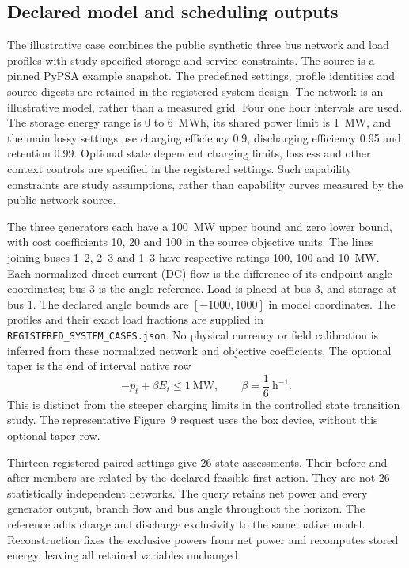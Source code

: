 \subsection{Declared model and scheduling outputs}
The illustrative case combines the public synthetic three bus network and
load profiles with study specified storage and service constraints.
The source is a pinned PyPSA example snapshot\cite{pypsa_examples_snapshot_23e2436}.
The predefined settings, profile identities and source digests are retained
in the registered system design. The network is an illustrative model,
rather than a measured grid. Four one hour intervals are used. The storage
energy range is 0 to 6~MWh, its shared power limit is 1~MW, and the main
lossy settings use charging efficiency 0.9, discharging efficiency 0.95 and
retention 0.99. Optional state dependent charging limits, lossless and
other context controls are specified in the registered settings. Such
capability constraints are study assumptions, rather than capability curves
measured by the public network source.

The three generators each have a 100~MW upper bound and zero lower bound,
with cost coefficients 10, 20 and 100 in the source objective units.
The lines joining buses 1--2, 2--3 and 1--3 have respective ratings
100, 100 and 10~MW. Each normalized direct current (DC) flow is the difference
of its endpoint angle coordinates; bus 3 is the angle reference. Load is
placed at bus 3, and storage at bus 1. The declared angle bounds are
$[-1000,1000]$ in model coordinates. The profiles and their exact load
fractions are supplied in \texttt{REGISTERED\_SYSTEM\_CASES.json}.
No physical currency or field calibration is inferred from these normalized
network and objective coefficients.
The optional taper is the end of interval native row
\begin{equation}
-p_t+\beta E_t\leq 1\ \mathrm{MW},\qquad
\beta=\frac{1}{6}\ \mathrm{h}^{-1}.
\label{eq:sat_synthetic_taper}
\end{equation}
This is distinct from the steeper charging limits in the controlled
state transition study. The representative Figure~9 request uses the box
device, without this optional taper row.

Thirteen registered paired settings give 26 state assessments. Their
before and after members are related by the declared feasible first action.
They are not 26 statistically independent networks. The query retains net
power and every generator output, branch flow and bus angle throughout the
horizon. The reference adds charge and discharge exclusivity to the same
native model. Reconstruction fixes the exclusive powers from net power and
recomputes stored energy, leaving all retained variables unchanged.

